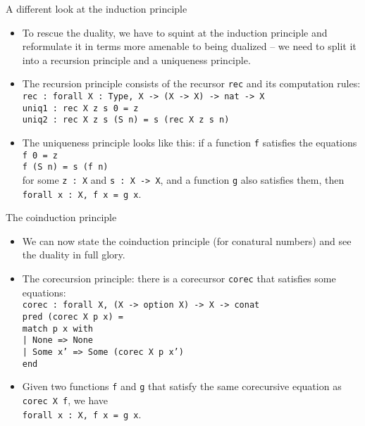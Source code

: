 \documentclass{beamer}
\begin{document}
\begin{frame}{A different look at the induction principle}
\begin{itemize}
	\item To rescue the duality, we have to squint at the induction principle and reformulate it in terms more amenable to being dualized -- we need to split it into a recursion principle and a uniqueness principle.
	\item The recursion principle consists of the recursor \texttt{rec} and its computation rules: \\
	\texttt{rec : forall X : Type, X -> (X -> X) -> nat -> X} \\
	\texttt{uniq1 : rec X z s 0 = z} \\
	\texttt{uniq2 : rec X z s (S n) = s (rec X z s n)}
	\item The uniqueness principle looks like this: if a function \texttt{f} satisfies the equations \\
	\texttt{f 0 = z} \\
	\texttt{f (S n) = s (f n)} \\
	for some \texttt{z : X} and \texttt{s : X -> X}, and a function \texttt{g} also satisfies them, then \texttt{forall x : X, f x = g x}.
\end{itemize}
\end{frame}

\begin{frame}{The coinduction principle}
\begin{itemize}
	\item We can now state the coinduction principle (for conatural numbers) and see the duality in full glory.
	\item The corecursion principle: there is a corecursor \texttt{corec} that satisfies some equations: \\
	\texttt{corec : forall X, (X -> option X) -> X -> conat} \\
	\texttt{pred (corec X p x) =\\
	match p x with \\
	| None => None \\
	| Some x' => Some (corec X p x') \\
	end}
	\item Given two functions \texttt{f} and \texttt{g} that satisfy the same corecursive equation as \texttt{corec X f}, we have \\
	\texttt{forall x : X, f x = g x}.
\end{itemize}
\end{frame}
\end{document}
